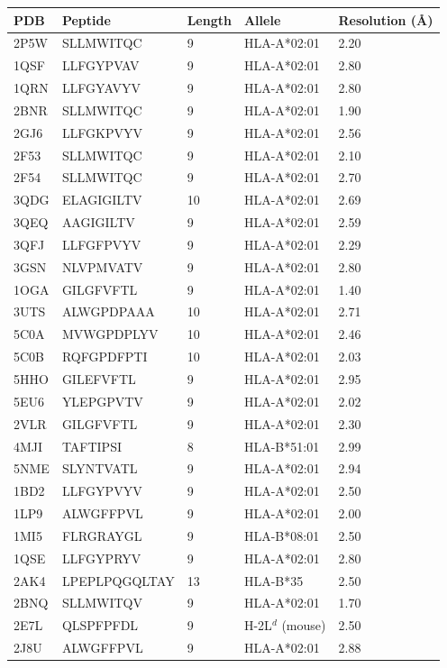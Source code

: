 \documentclass[letterpaper]{article}
\begin{document}
\begin{table}[p]
\renewcommand{\thetable}{S1}
\centering
\small
\begin{tabular}{lllll}
\toprule
PDB & Peptide & Length & Allele & Resolution (\AA) \\
\midrule
2P5W & SLLMWITQC & 9 & HLA-A*02:01 & 2.20 \\
1QSF & LLFGYPVAV & 9 & HLA-A*02:01 & 2.80 \\
1QRN & LLFGYAVYV & 9 & HLA-A*02:01 & 2.80 \\
2BNR & SLLMWITQC & 9 & HLA-A*02:01 & 1.90 \\
2GJ6 & LLFGKPVYV & 9 & HLA-A*02:01 & 2.56 \\
2F53 & SLLMWITQC & 9 & HLA-A*02:01 & 2.10 \\
2F54 & SLLMWITQC & 9 & HLA-A*02:01 & 2.70 \\
3QDG & ELAGIGILTV & 10 & HLA-A*02:01 & 2.69 \\
3QEQ & AAGIGILTV & 9 & HLA-A*02:01 & 2.59 \\
3QFJ & LLFGFPVYV & 9 & HLA-A*02:01 & 2.29 \\
3GSN & NLVPMVATV & 9 & HLA-A*02:01 & 2.80 \\
1OGA & GILGFVFTL & 9 & HLA-A*02:01 & 1.40 \\
3UTS & ALWGPDPAAA & 10 & HLA-A*02:01 & 2.71 \\
5C0A & MVWGPDPLYV & 10 & HLA-A*02:01 & 2.46 \\
5C0B & RQFGPDFPTI & 10 & HLA-A*02:01 & 2.03 \\
5HHO & GILEFVFTL & 9 & HLA-A*02:01 & 2.95 \\
5EU6 & YLEPGPVTV & 9 & HLA-A*02:01 & 2.02 \\
2VLR & GILGFVFTL & 9 & HLA-A*02:01 & 2.30 \\
4MJI & TAFTIPSI & 8 & HLA-B*51:01 & 2.99 \\
5NME & SLYNTVATL & 9 & HLA-A*02:01 & 2.94 \\
\midrule
1BD2 & LLFGYPVYV & 9 & HLA-A*02:01 & 2.50 \\
1LP9 & ALWGFFPVL & 9 & HLA-A*02:01 & 2.00 \\
1MI5 & FLRGRAYGL & 9 & HLA-B*08:01 & 2.50 \\
1QSE & LLFGYPRYV & 9 & HLA-A*02:01 & 2.80 \\
2AK4 & LPEPLPQGQLTAY & 13 & HLA-B*35 & 2.50 \\
2BNQ & SLLMWITQV & 9 & HLA-A*02:01 & 1.70 \\
2E7L & QLSPFPFDL & 9 & H-2L$^d$ (mouse) & 2.50 \\
2J8U & ALWGFFPVL & 9 & HLA-A*02:01 & 2.88 \\

\end{tabular}
\end{table}
\end{document}
